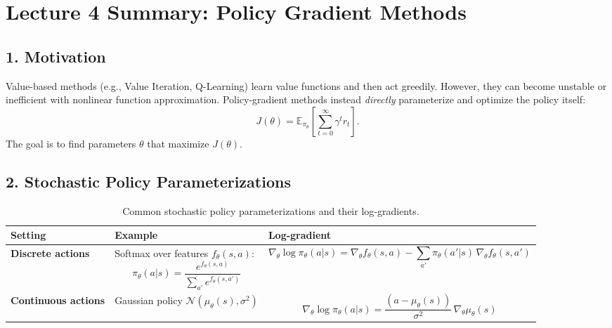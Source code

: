 \makeatletter
{} %
\makeatother




\section*{Lecture 4 Summary: Policy Gradient Methods}

\subsection*{1. Motivation}

Value-based methods (e.g., Value Iteration, Q-Learning) learn value functions and then act greedily.
However, they can become unstable or inefficient with nonlinear function approximation.
Policy-gradient methods instead \emph{directly} parameterize and optimize the policy itself:
\[
		J(\theta) = \mathbb{E}_{\pi_\theta}\!\left[ \sum_{t=0}^{\infty} \gamma^t r_t \right].
\]
The goal is to find parameters $\theta$ that maximize $J(\theta)$.

\subsection*{2. Stochastic Policy Parameterizations}

\begin{table}[h!]
		\centering
		\begin{tabular}{lll}
				\toprule
				\textbf{Setting} & \textbf{Example} & \textbf{Log-gradient} \\
				\midrule
				\textbf{Discrete actions} &
				Softmax over features $f_\theta(s,a)$:
				\[
						\pi_\theta(a|s) = \frac{e^{f_\theta(s,a)}}{\sum_{a'} e^{f_\theta(s,a')}}
				\]
				&
				\[
						\nabla_\theta \log \pi_\theta(a|s)
						= \nabla_\theta f_\theta(s,a)
						- \sum_{a'} \pi_\theta(a'|s)\,\nabla_\theta f_\theta(s,a')
				\]
				\\[1.2em]
				\textbf{Continuous actions} &
				Gaussian policy $\mathcal{N}(\mu_\theta(s), \sigma^2)$ &
				\[
						\nabla_\theta \log \pi_\theta(a|s)
						= \frac{(a - \mu_\theta(s))}{\sigma^2}\,\nabla_\theta \mu_\theta(s)
				\]
				\\
				\bottomrule
		\end{tabular}
		\caption{Common stochastic policy parameterizations and their log-gradients.}
\end{table}

